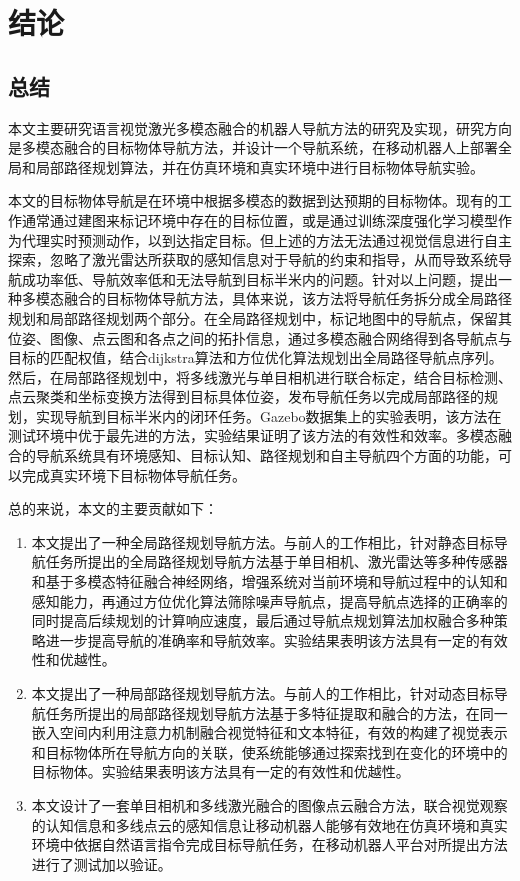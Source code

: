 \chapter{结\texorpdfstring{\quad}{}论}
\section{总结}
本文主要研究语言视觉激光多模态融合的机器人导航方法的研究及实现，研究方向是多模态融合的目标物体导航方法，并设计一个导航系统，在移动机器人上部署全局和局部路径规划算法，并在仿真环境和真实环境中进行目标物体导航实验。
	
本文的目标物体导航是在环境中根据多模态的数据到达预期的目标物体。现有的工作通常通过建图来标记环境中存在的目标位置，或是通过训练深度强化学习模型作为代理实时预测动作，以到达指定目标。但上述的方法无法通过视觉信息进行自主探索，忽略了激光雷达所获取的感知信息对于导航的约束和指导，从而导致系统导航成功率低、导航效率低和无法导航到目标半米内的问题。针对以上问题，提出一种多模态融合的目标物体导航方法，具体来说，该方法将导航任务拆分成全局路径规划和局部路径规划两个部分。在全局路径规划中，标记地图中的导航点，保留其位姿、图像、点云图和各点之间的拓扑信息，通过多模态融合网络得到各导航点与目标的匹配权值，结合dijkstra算法和方位优化算法规划出全局路径导航点序列。然后，在局部路径规划中，将多线激光与单目相机进行联合标定，结合目标检测、点云聚类和坐标变换方法得到目标具体位姿，发布导航任务以完成局部路径的规划，实现导航到目标半米内的闭环任务。Gazebo数据集上的实验表明，该方法在测试环境中优于最先进的方法，实验结果证明了该方法的有效性和效率。多模态融合的导航系统具有环境感知、目标认知、路径规划和自主导航四个方面的功能，可以完成真实环境下目标物体导航任务。

总的来说，本文的主要贡献如下：
\begin{enumerate}[topsep = 0 pt, itemsep= 0 pt, parsep=0pt, partopsep=0pt, leftmargin=44pt, itemindent=0pt, labelsep=6pt, label=(\arabic*)]
    \item 	本文提出了一种全局路径规划导航方法。与前人的工作相比，针对静态目标导航任务所提出的全局路径规划导航方法基于单目相机、激光雷达等多种传感器和基于多模态特征融合神经网络，增强系统对当前环境和导航过程中的认知和感知能力，再通过方位优化算法筛除噪声导航点，提高导航点选择的正确率的同时提高后续规划的计算响应速度，最后通过导航点规划算法加权融合多种策略进一步提高导航的准确率和导航效率。实验结果表明该方法具有一定的有效性和优越性。
    \item	本文提出了一种局部路径规划导航方法。与前人的工作相比，针对动态目标导航任务所提出的局部路径规划导航方法基于多特征提取和融合的方法，在同一嵌入空间内利用注意力机制融合视觉特征和文本特征，有效的构建了视觉表示和目标物体所在导航方向的关联，使系统能够通过探索找到在变化的环境中的目标物体。实验结果表明该方法具有一定的有效性和优越性。
    \item	本文设计了一套单目相机和多线激光融合的图像点云融合方法，联合视觉观察的认知信息和多线点云的感知信息让移动机器人能够有效地在仿真环境和真实环境中依据自然语言指令完成目标导航任务，在移动机器人平台对所提出方法进行了测试加以验证。
\end{enumerate}


